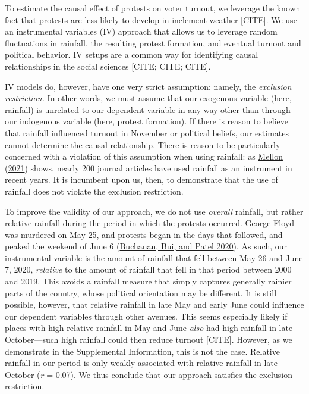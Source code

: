 \documentclass[
  12pt,
]{article}
\begin{document}
To estimate the causal effect of protests on voter turnout, we leverage the known fact that protests are less likely to develop in inclement weather {[}CITE{]}. We use an instrumental variables (IV) approach that allows us to leverage random fluctuations in rainfall, the resulting protest formation, and eventual turnout and political behavior. IV setups are a common way for identifying causal relationships in the social sciences {[}CITE; CITE; CITE{]}.

IV models do, however, have one very strict assumption: namely, the \emph{exclusion restriction.} In other words, we must assume that our exogenous variable (here, rainfall) is unrelated to our dependent variable in any way other than through our indogenous variable (here, protest formation). If there is reason to believe that rainfall influenced turnout in November or political beliefs, our estimates cannot determine the causal relationship. There is reason to be particularly concerned with a violation of this assumption when using rainfall: as \protect\hyperlink{ref-Mellon2021}{Mellon} (\protect\hyperlink{ref-Mellon2021}{2021}) shows, nearly 200 journal articles have used rainfall as an instrument in recent years. It is incumbent upon us, then, to demonstrate that the use of rainfall does not violate the exclusion restriction.

To improve the validity of our approach, we do not use \emph{overall} rainfall, but rather relative rainfall during the period in which the protests occurred. George Floyd was murdered on May 25, and protests began in the days that followed, and peaked the weekend of June 6 (\protect\hyperlink{ref-Buchanan2020}{Buchanan, Bui, and Patel 2020}). As such, our instrumental variable is the amount of rainfall that fell between May 26 and June 7, 2020, \emph{relative} to the amount of rainfall that fell in that period between 2000 and 2019. This avoids a rainfall measure that simply captures generally rainier parts of the country, whose political orientation may be different. It is still possible, however, that relative rainfall in late May and early June could influence our dependent variables through other avenues. This seems especially likely if places with high relative rainfall in May and June \emph{also} had high rainfall in late October---such high rainfall could then reduce turnout {[}CITE{]}. However, as we demonstrate in the Supplemental Information, this is not the case. Relative rainfall in our period is only weakly associated with relative rainfall in late October (\emph{r} = 0.07). We thus conclude that our approach satisfies the exclusion restriction.
\end{document}
